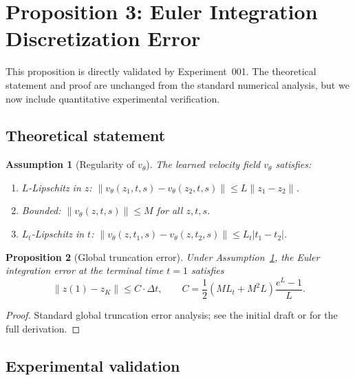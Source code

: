 \documentclass[letterpaper]{article}
\newtheorem{proposition}{Proposition}[section]
\newtheorem{assumption}[proposition]{Assumption}
\begin{document}
\section{Proposition 3: Euler Integration Discretization Error}

This proposition is directly validated by Experiment~001.
The theoretical statement and proof are unchanged from the standard
numerical analysis, but we now include quantitative experimental verification.

\subsection{Theoretical statement}

\begin{assumption}[Regularity of $v_\theta$]
\label{asm:regularity_euler}
The learned velocity field $v_\theta$ satisfies:
\begin{enumerate}[nosep]
    \item $L$-Lipschitz in $z$: $\|v_\theta(z_1,t,s)-v_\theta(z_2,t,s)\| \leq L\|z_1-z_2\|$.
    \item Bounded: $\|v_\theta(z,t,s)\| \leq M$ for all $z,t,s$.
    \item $L_t$-Lipschitz in $t$: $\|v_\theta(z,t_1,s)-v_\theta(z,t_2,s)\| \leq L_t|t_1-t_2|$.
\end{enumerate}
\end{assumption}

\begin{proposition}[Global truncation error]
\label{prop:euler_error}
Under Assumption~\ref{asm:regularity_euler}, the Euler integration error
at the terminal time $t=1$ satisfies
\begin{equation}
    \bigl\| z(1) - z_K \bigr\| \leq C \cdot \Delta t,\qquad
    C = \frac{1}{2} (M L_t + M^2 L) \frac{e^L - 1}{L}.
    \label{eq:euler_bound}
\end{equation}
\end{proposition}

\begin{proof}
Standard global truncation error analysis; see the initial draft or
\cite{atkinson2009numerical} for the full derivation.
\end{proof}

\subsection{Experimental validation}
\end{document}
